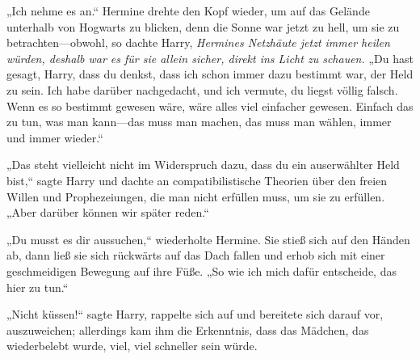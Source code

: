 „Ich nehme es an.“
Hermine drehte den Kopf wieder, um auf das Gelände unterhalb von Hogwarts zu blicken, denn die Sonne war jetzt zu hell, um sie zu betrachten—obwohl, so dachte Harry, \emph{Hermines Netzhäute jetzt immer heilen würden, deshalb war es für sie allein sicher, direkt ins Licht zu schauen.}
„Du hast gesagt, Harry, dass du denkst, dass ich schon immer dazu bestimmt war, der Held zu sein. Ich habe darüber nachgedacht, und ich vermute, du liegst völlig falsch. Wenn es so bestimmt gewesen wäre, wäre alles viel einfacher gewesen. Einfach das zu tun, was man kann—das muss man machen, das muss man wählen, immer und immer wieder.“

„Das steht vielleicht nicht im Widerspruch dazu, dass du ein auserwählter Held bist,“ sagte Harry und dachte an compatibilistische Theorien über den freien Willen und Prophezeiungen, die man nicht erfüllen muss, um sie zu erfüllen.
„Aber darüber können wir später reden.“

„Du musst es dir aussuchen,“ wiederholte Hermine.
Sie stieß sich auf den Händen ab, dann ließ sie sich rückwärts auf das Dach fallen und erhob sich mit einer geschmeidigen Bewegung auf ihre Füße.
„So wie ich mich dafür entscheide, das hier zu tun.“

„Nicht küssen!“ sagte Harry, rappelte sich auf und bereitete sich darauf vor, auszuweichen; allerdings kam ihm die Erkenntnis, dass das Mädchen, das wiederbelebt wurde, viel, viel schneller sein würde.

